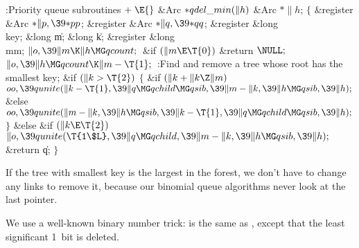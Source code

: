 \Y\B\4:Priority queue subroutines\X${}\mathrel+\E{}$\6
\1\1\&{Arc} ${}{*}\\{qdel\_min}(\|h){}$\6
\&{Arc} ${}{*}\|h{}$;\2\2\6
${}\{{}$\5
\1\&{register} \&{Arc} ${}{*}\|p,\39{*}\\{pp}{}$;\6
\&{register} \&{Arc} ${}{*}\|q,\39{*}\\{qq}{}$;\6
\&{register} \&{long} \\{key};\6
\&{long} \|m;\6
\&{long} \|k;\6
\&{register} \&{long} \\{mm};\7
${}\|o,\39\|m\K\|h\MG\\{qcount};{}$\6
\&{if} ${}(\|m\E\T{0}){}$\1\5
\&{return} ${}\NULL;{}$\2\6
${}\|o,\39\|h\MG\\{qcount}\K\|m-\T{1};{}$\6
:Find and remove a tree whose root  has the smallest key\X;\6
\&{if} ${}(\|k>\T{2}){}$\5
${}\{{}$\1\6
\&{if} ${}(\|k+\|k\Z\|m){}$\1\5
${}\\{oo},\39\\{qunite}(\|k-\T{1},\39\|q\MG\\{qchild}\MG\\{qsib},\39\|m-\|k,\39%
\|h\MG\\{qsib},\39\|h);{}$\2\6
\&{else}\1\5
${}\\{oo},\39\\{qunite}(\|m-\|k,\39\|h\MG\\{qsib},\39\|k-\T{1},\39\|q\MG%
\\{qchild}\MG\\{qsib},\39\|h);{}$\2\6
\4${}\}{}$\5
\2\&{else} \&{if} ${}(\|k\E\T{2}){}$\1\5
${}\|o,\39\\{qunite}(\T{1\$L},\39\|q\MG\\{qchild},\39\|m-\|k,\39\|h\MG\\{qsib},%
\39\|h);{}$\2\6
\&{return} \|q;\6
\4${}\}{}$\2\par
\fi

If the tree with smallest key is the largest in the forest,
we don't have to change any links to remove it,
because our binomial queue algorithms never look at the last 
pointer.

We use a well-known binary number trick:  is the same
as
, except that the least significant 1~bit is deleted.

